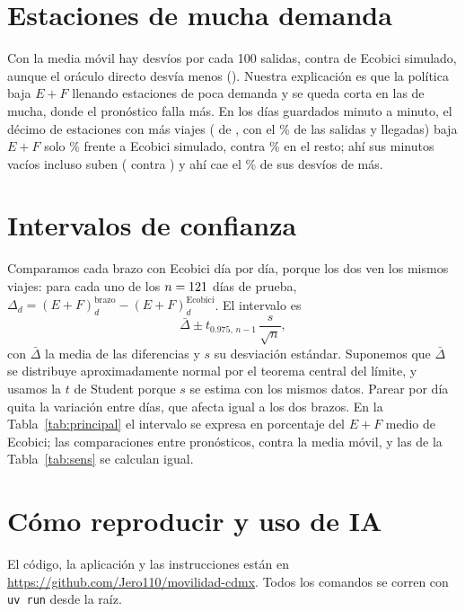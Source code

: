 \documentclass[conference,letterpaper,10pt]{IEEEtran}
\newcommand{\EF}{E+F}
\begin{document}
\section{Estaciones de mucha demanda}\label{ap:demanda}
Con la media móvil hay \rmaDesvPct{} desvíos por cada 100 salidas, contra \recoDesvPct{} de Ecobici simulado, aunque el oráculo directo desvía menos (\rorDirDesvPct). Nuestra explicación es que la política baja $\EF$ llenando estaciones de poca demanda y se queda corta en las de mucha, donde el pronóstico falla más. En los \rcfDias{} días guardados minuto a minuto, el décimo de estaciones con más viajes (\rdTop{} de \rdEst, con el \rdTopViajes\% de las salidas y llegadas) baja $\EF$ solo \rdEFTopRed\% frente a Ecobici simulado, contra \rdEFRestoRed\% en el resto; ahí sus minutos vacíos incluso suben (\rdETopMa{} contra \rdETopEco) y ahí cae el \rdMaExtraTop\% de sus desvíos de más.

\section{Intervalos de confianza}\label{ap:ic}
Comparamos cada brazo con Ecobici día por día, porque los dos ven los mismos viajes: para cada uno de los $n=121$ días de prueba, $\Delta_d=(E+F)_d^{\text{brazo}}-(E+F)_d^{\text{Ecobici}}$. El intervalo es
\[
\bar\Delta\pm t_{0.975,\,n-1}\,\frac{s}{\sqrt n},
\]
con $\bar\Delta$ la media de las diferencias y $s$ su desviación estándar. Suponemos que $\bar\Delta$ se distribuye aproximadamente normal por el teorema central del límite, y usamos la $t$ de Student porque $s$ se estima con los mismos datos. Parear por día quita la variación entre días, que afecta igual a los dos brazos. En la Tabla~\ref{tab:principal} el intervalo se expresa en porcentaje del $\EF$ medio de Ecobici; las comparaciones entre pronósticos, contra la media móvil, y las de la Tabla~\ref{tab:sens} se calculan igual.

\section{Cómo reproducir y uso de IA}\label{ap:repro}
El código, la aplicación y las instrucciones están en \url{https://github.com/Jero110/movilidad-cdmx}. Todos los comandos se corren con \texttt{uv run} desde la raíz.
\end{document}
